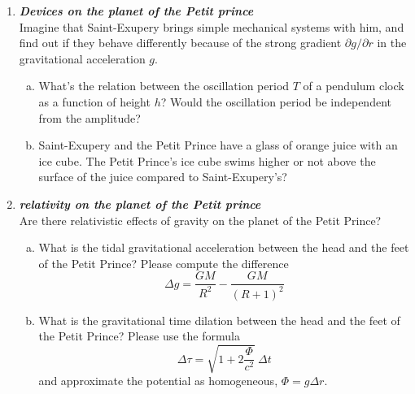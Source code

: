\documentclass[a4paper,12pt]{article}
\newcommand{\question}[1]{\textbf{\textit{#1}}}
\begin{document}
\begin{enumerate}
\item \question{Devices on the planet of the Petit prince}\\
Imagine that Saint-Exupery brings simple mechanical systems with him, and find out if they behave differently because of the strong gradient $\partial g/\partial r$ in the gravitational acceleration $g$.
\begin{enumerate}[(a)]
\item{What's the relation between the oscillation period $T$ of a pendulum clock as a function of height $h$? Would the oscillation period be independent from the amplitude?}
\item{Saint-Exupery and the Petit Prince have a glass of orange juice
    with an ice cube. The Petit Prince's ice cube swims higher or not above the surface of the juice compared to Saint-Exupery's?}
\end{enumerate}

\item \question{relativity on the planet of the Petit prince}\\
Are there relativistic effects of gravity on the planet of the Petit Prince?
\begin{enumerate}[(a)]
\item{What is the tidal gravitational acceleration between the head
    and the feet of the Petit Prince? Please compute the difference
\begin{equation}
\Delta g = \frac{GM}{R^2}-\frac{GM}{(R+1)^2} 
\end{equation}
}
\item{What is the gravitational time dilation between the head and the feet of the Petit Prince? Please use the formula
\begin{equation}
\Delta \tau = \sqrt{1+2\frac{\Phi}{c^2}}\:\Delta t
\end{equation}
and approximate the potential as homogeneous, $\Phi = g\Delta r$.
}
\end{enumerate}
\end{enumerate}
\end{document}
